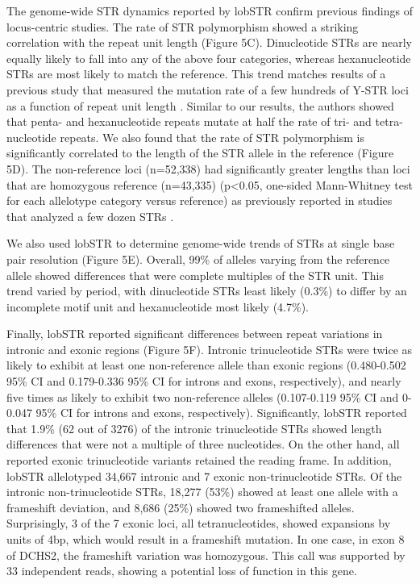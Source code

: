 The genome-wide STR dynamics reported by lobSTR confirm previous findings of locus-centric studies. The rate of STR polymorphism showed a striking correlation with the repeat unit length (Figure 5C). Dinucleotide STRs are nearly equally likely to fall into any of the above four categories, whereas hexanucleotide STRs are most likely to match the reference. This trend matches results of a previous study that measured the mutation rate of a few hundreds of Y-STR loci as a function of repeat unit length \cite{JarveZhivotovskyRootsiEtAl2009}.  Similar to our results, the authors showed that penta- and hexanucleotide repeats mutate at half the rate of tri- and tetra-nucleotide repeats. We also found that the rate of STR polymorphism is significantly correlated to the length of the STR allele in the reference (Figure 5D). The non-reference loci (n=52,338) had significantly greater lengths than loci that are homozygous reference (n=43,335) (p<0.05, one-sided Mann-Whitney test for each allelotype category versus reference) as previously reported in studies that analyzed a few dozen STRs \cite{BrinkmannKlintscharNeuhuberEtAl1998,Ellegren2000}. 

We also used lobSTR to determine genome-wide trends of STRs at single base pair resolution (Figure 5E). Overall, 99\% of alleles varying from the reference allele showed differences that were complete multiples of the STR unit. This trend varied by period, with dinucleotide STRs least likely (0.3\%) to differ by an incomplete motif unit and hexanucleotide most likely (4.7\%).

Finally, lobSTR reported significant differences between repeat variations in intronic and exonic regions (Figure 5F). Intronic trinucleotide STRs were twice as likely to exhibit at least one non-reference allele than exonic regions (0.480-0.502 95\% CI and 0.179-0.336 95\% CI for introns and exons, respectively), and nearly five times as likely to exhibit two non-reference alleles (0.107-0.119 95\% CI and 0-0.047 95\% CI for introns and exons, respectively). Significantly, lobSTR reported that 1.9\% (62 out of 3276) of the intronic trinucleotide STRs showed length differences that were not a multiple of three nucleotides. On the other hand, all reported exonic trinucleotide variants retained the reading frame. In addition, lobSTR allelotyped 34,667 intronic and 7 exonic non-trinucleotide STRs. Of the intronic non-trinucleotide STRs, 18,277 (53\%) showed at least one allele with a frameshift deviation, and 8,686 (25\%) showed two frameshifted alleles. Surprisingly, 3 of the 7 exonic loci, all tetranucleotides, showed expansions by units of 4bp, which would result in a frameshift mutation. In one case, in exon 8 of DCHS2, the frameshift variation was homozygous. This call was supported by 33 independent reads, showing a potential loss of function in this gene.

